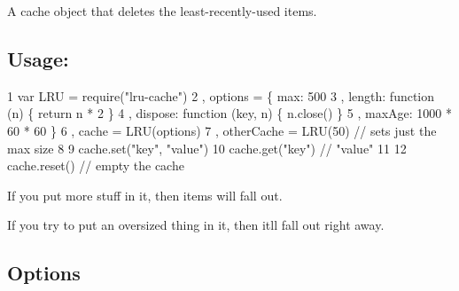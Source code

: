A cache object that deletes the least-\/recently-\/used items.

\subsection*{Usage\+:}


\begin{DoxyCode}
1 var LRU = require("lru-cache")
2   , options = \{ max: 500
3               , length: function (n) \{ return n * 2 \}
4               , dispose: function (key, n) \{ n.close() \}
5               , maxAge: 1000 * 60 * 60 \}
6   , cache = LRU(options)
7   , otherCache = LRU(50) // sets just the max size
8 
9 cache.set("key", "value")
10 cache.get("key") // "value"
11 
12 cache.reset()    // empty the cache
\end{DoxyCode}


If you put more stuff in it, then items will fall out.

If you try to put an oversized thing in it, then it\textquotesingle{}ll fall out right away.

\subsection*{Options}


